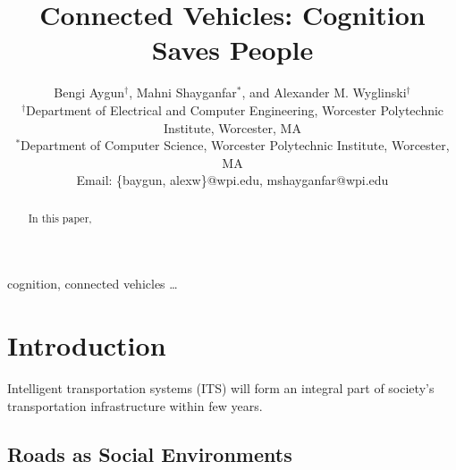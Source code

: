 \documentclass[journal, 11pt]{IEEEtran}
\begin{document}
\title{Connected Vehicles: Cognition Saves People}

\author{Bengi Aygun$^\dag$, Mahni Shayganfar$^*$, and Alexander M. Wyglinski$^\dag$\\
\normalsize $^\dag$Department of Electrical and Computer Engineering, Worcester Polytechnic Institute, Worcester, MA\\
\normalsize $^*$Department of Computer Science, Worcester Polytechnic Institute, Worcester, MA\\
\normalsize Email: \{baygun, alexw\}@wpi.edu, mshayganfar@wpi.edu}

\maketitle

\begin{abstract}
In this paper,
\end{abstract}

\begin{keywords}
cognition, connected vehicles \ldots
\end{keywords}%

\IEEEpeerreviewmaketitle
\section{Introduction}
%
Intelligent transportation systems (ITS) will form an integral part of society's
transportation infrastructure within few years.

\subsection{Roads as Social Environments}
\end{document}
